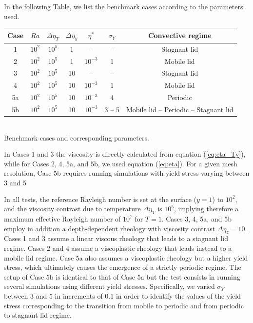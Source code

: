 In the following Table, we list the benchmark cases according to the parameters used. 
\begin{center}
\begin{tabular}{c c c c c c c} 
\hline
Case & $Ra$ & $\Delta\eta_T$ & $\Delta\eta_y$ & $\eta^*$ & $\sigma_Y$ & Convective regime \\
\hline
1   & $10^2$ & $10^5$    & 1  & -- & --             & Stagnant lid    \\
2   & $10^2$ & $10^5$    & 1  & $10^{-3}$ & 1       & Mobile lid \\
3   & $10^2$ & $10^5$    & 10 & --  & --            & Stagnant lid \\
4   & $10^2$ & $10^5$    & 10 & $10^{-3}$ & 1       & Mobile lid  \\
5a  & $10^2$ & $10^5$    & 10 & $10^{-3}$ & 4       & Periodic  \\
5b  & $10^2$ & $10^5$    & 10 & $10^{-3}$ & 3 -- 5  & Mobile lid -- Periodic -- Stagnant lid \\
\hline
\end{tabular}\\
{\small Benchmark cases and corresponding parameters.} 
\end{center}

In Cases 1 and 3 the viscosity is directly calculated from equation (\ref{eq:eta_Ty}), 
while for Cases 2, 4, 5a, and 5b, we used equation (\ref{eq:eta}). For a given mesh resolution, 
Case 5b requires running simulations with yield stress varying between 3 and 5


In all tests, the reference Rayleigh number is set at the surface ($y=1$) to $10^2$, and the viscosity contrast due to temperature $\Delta\eta_T$ is $10^5$, implying therefore a maximum effective Rayleigh number of $10^7$ for $T=1$. Cases 3, 4, 5a, and 5b employ in addition a depth-dependent rheology with viscosity contrast  $\Delta\eta_z=10$. Cases 1 and 3 assume a linear viscous rheology that leads to a stagnant lid regime. Cases 2 and 4 assume a viscoplastic rheology that leads instead to a mobile lid regime. Case 5a also assumes a viscoplastic rheology but a higher yield stress, which ultimately causes the emergence of a strictly periodic regime. The setup of Case 5b is identical to that of Case 5a but the test consists in running several simulations using different yield stresses. Specifically, we varied $\sigma_Y$ between 3 and 5 in increments of 0.1 in order to identify the values of the yield stress corresponding to the transition from mobile to periodic and from periodic to stagnant lid regime. 

